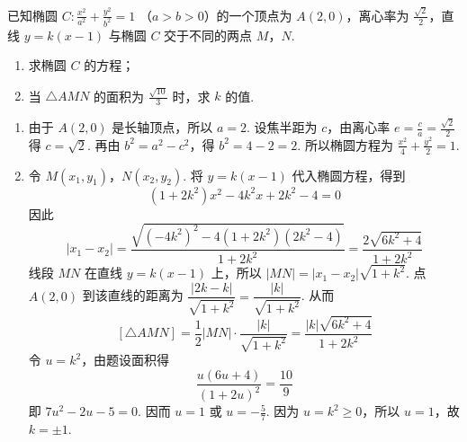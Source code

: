 \begin{problem}
已知椭圆 \(C: \frac{x^2}{a^2} + \frac{y^2}{b^2} = 1\) （\(a > b > 0\)）的一个顶点为 \(A(2, 0)\)，离心率为 \(\frac{\sqrt{2}}{2}\)，直线 \(y = k(x - 1)\) 与椭圆 \(C\) 交于不同的两点 \(M\)，\(N\).

\begin{enumerate}
\item 求椭圆 \(C\) 的方程；
\item 当 \(\triangle AMN\) 的面积为 \(\frac{\sqrt{10}}{3}\) 时，求 \(k\) 的值.
\end{enumerate}
\begin{solution}
\begin{enumerate}
\item 由于 \(A(2,0)\) 是长轴顶点，所以 \(a=2\). 设焦半距为 \(c\)，由离心率
\(e=\frac{c}{a}=\frac{\sqrt{2}}{2}\) 得 \(c=\sqrt{2}\). 再由 \(b^2=a^2-c^2\)，得 \(b^2=4-2=2\). 所以椭圆方程为
\(\frac{x^2}{4}+\frac{y^2}{2}=1\).

\item 令 \(M(x_1,y_1)\)，\(N(x_2,y_2)\). 将 \(y=k(x-1)\) 代入椭圆方程，得到
\[
(1+2k^2)x^2-4k^2x+2k^2-4=0
\]
因此
\[
|x_1-x_2|=\frac{\sqrt{(-4k^2)^2-4(1+2k^2)(2k^2-4)}}{1+2k^2}
=\frac{2\sqrt{6k^2+4}}{1+2k^2}
\]
线段 \(MN\) 在直线 \(y=k(x-1)\) 上，所以
\(|MN|=|x_1-x_2|\sqrt{1+k^2}\). 点 \(A(2,0)\) 到该直线的距离为
\(\dfrac{|2k-k|}{\sqrt{1+k^2}}=\dfrac{|k|}{\sqrt{1+k^2}}\). 从而
\[
[\triangle AMN]=\frac{1}{2}|MN|\cdot\frac{|k|}{\sqrt{1+k^2}}
=\frac{|k|\sqrt{6k^2+4}}{1+2k^2}
\]
令 \(u=k^2\)，由题设面积得
\[
\frac{u(6u+4)}{(1+2u)^2}=\frac{10}{9}
\]
即 \(7u^2-2u-5=0\). 因而 \(u=1\) 或 \(u=-\frac{5}{7}\). 因为 \(u=k^2\geqslant0\)，所以 \(u=1\)，故 \(k=\pm1\).
\end{enumerate}
\end{solution}
\end{problem}

